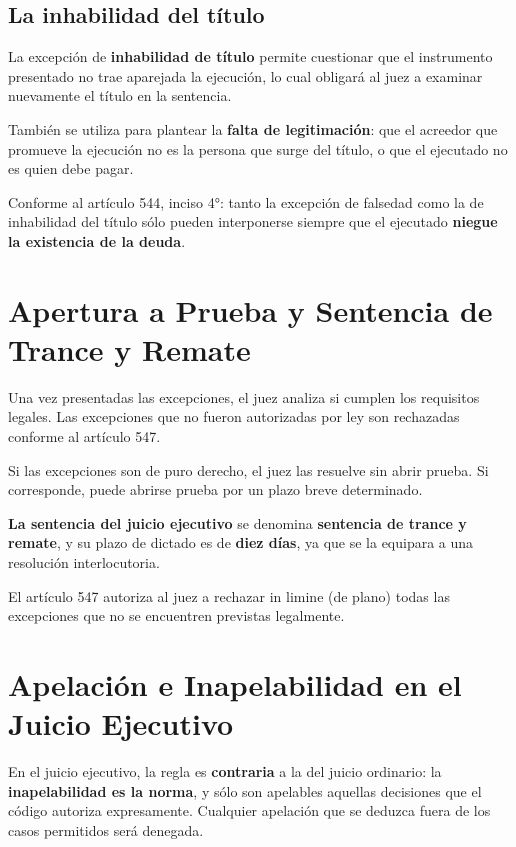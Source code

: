\documentclass[12pt,oneside]{book}
\begin{document}
\subsection{La inhabilidad del título}

La excepción de \textbf{inhabilidad de título} permite cuestionar que el instrumento presentado no trae aparejada la ejecución, lo cual obligará al juez a examinar nuevamente el título en la sentencia.

También se utiliza para plantear la \textbf{falta de legitimación}: que el acreedor que promueve la ejecución no es la persona que surge del título, o que el ejecutado no es quien debe pagar.

\begin{important}
Conforme al artículo 544, inciso 4°: tanto la excepción de falsedad como la de inhabilidad del título sólo pueden interponerse siempre que el ejecutado \textbf{niegue la existencia de la deuda}.
\end{important}

\section{Apertura a Prueba y Sentencia de Trance y Remate}

Una vez presentadas las excepciones, el juez analiza si cumplen los requisitos legales. Las excepciones que no fueron autorizadas por ley son rechazadas conforme al artículo 547.

Si las excepciones son de puro derecho, el juez las resuelve sin abrir prueba. Si corresponde, puede abrirse prueba por un plazo breve determinado.

\textbf{La sentencia del juicio ejecutivo} se denomina \textbf{sentencia de trance y remate}, y su plazo de dictado es de \textbf{diez días}, ya que se la equipara a una resolución interlocutoria.

\begin{note}
El artículo 547 autoriza al juez a rechazar in limine (de plano) todas las excepciones que no se encuentren previstas legalmente.
\end{note}

\section{Apelación e Inapelabilidad en el Juicio Ejecutivo}

En el juicio ejecutivo, la regla es \textbf{contraria} a la del juicio ordinario: la \textbf{inapelabilidad es la norma}, y sólo son apelables aquellas decisiones que el código autoriza expresamente. Cualquier apelación que se deduzca fuera de los casos permitidos será denegada.
\end{document}
